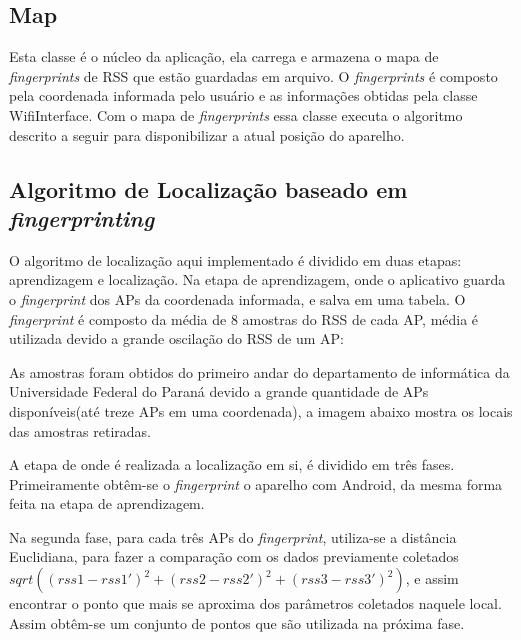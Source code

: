   \subsection{Map}
  Esta classe é o núcleo da aplicação, ela carrega e armazena o mapa de \textit{fingerprints} de RSS que estão 
  guardadas em arquivo. 
  O \textit{fingerprints} é composto 
  pela coordenada informada pelo usuário e as informações obtidas pela classe WifiInterface. 
  Com o mapa de \textit{fingerprints} essa classe executa o algoritmo descrito a seguir para disponibilizar 
  a atual posição do aparelho.
   
  \subsection{Algoritmo de Localização baseado em \textit{fingerprinting}}
  
  O algoritmo de localização aqui implementado é dividido em duas etapas: aprendizagem e localização. Na etapa de aprendizagem, 
  onde o aplicativo guarda o \textit{fingerprint} dos APs da coordenada informada,
  e salva em uma tabela. O \textit{fingerprint} é composto da média de 8 amostras do RSS de cada AP, média é utilizada 
  devido a grande oscilação do RSS de um AP:
  
  As amostras foram obtidos do primeiro andar do departamento de informática da Universidade Federal do Paraná devido a 
  grande quantidade de APs disponíveis(até treze APs em uma coordenada), a imagem abaixo mostra os locais das amostras retiradas.
  
  A etapa de onde é realizada a localização em si, é dividido em três fases. Primeiramente obtêm-se o \textit{fingerprint}
  o aparelho com Android, da mesma forma feita na etapa de aprendizagem. 
  
  Na segunda fase, para cada três APs do \textit{fingerprint}, utiliza-se a distância Euclidiana, para fazer a comparação com os 
  dados previamente coletados $sqrt((rss1-rss1')^{2}+(rss2-rss2')^{2}+(rss3-rss3')^{2})$, 
e assim encontrar o ponto que mais se aproxima dos parâmetros coletados naquele local. 
Assim obtêm-se um conjunto de pontos que são utilizada na próxima fase.

 
  \begin{comment}
  -Criação da tabela:
    -para a coordenada em questão são obtidas 8 amostras da força do sinal wifi, e é feita a 
    média de cada força de sinal wifi de cada AP.
	- Pois O RSS varia muito(exibir exemplo).
  -Calculo da posição(3 fases):
    - Permite obter a posição do aparelho mesmo sem um fingerprint da posição do aparelho.
	- com as triangulações obtem-se o pontos que se aproxima da posição real.
    -obtem se 8 amostras do APs wifis e faz-se média.
    - para cada 3 APs obtem-se um ponto do mapa.
	- Esse ponto é obtido calculando a menor distância euclidiana entre os APs na amostragem e 
	e os dados salvos na tabela.
    - Com o esse conjunto de pontos, calcula-se o mmq com a biblioteca do apache(citar).
      -Onde obtem se o melhor ponto que resume os pontos obtidos.
    -Colocar imagem.
    \end{comment}
